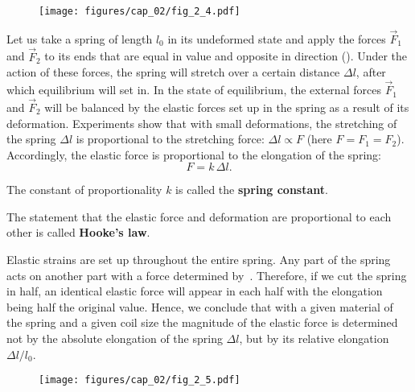 \begin{figure}[t]
	\begin{center}
		\texttt{[image: figures/cap\_02/fig\_2\_4.pdf]}
		\caption[]{}
		\label{fig:2_4}
	\end{center}
	\vspace{-0.8cm}
\end{figure}

Let us take a spring of length $l_0$ in its undeformed state and apply the forces $\vec{F}_1$ and $\vec{F}_2$ to its ends that are equal in value and opposite in direction (). Under the action of these forces, the spring will stretch over a certain distance $\Delta l$, after which equilibrium will set in. In the state of equilibrium, the external forces $\vec{F}_1$ and $\vec{F}_2$ will be balanced by the elastic forces set up in the spring as a result of its deformation. Experiments show that with small deformations, the stretching of the spring $\Delta l$ is proportional to the stretching force: $\Delta l\propto F$ (here $F=F_1=F_2$). Accordingly, the elastic force is proportional to the elongation of the spring:
\begin{equation}\label{eq:2_25}
F = k\,\Delta l.
\end{equation}

\noindent
The constant of proportionality $k$ is called the \textbf{spring constant}.

The statement that the elastic force and deformation are proportional to each other is called \textbf{Hooke's law}.

Elastic strains are set up throughout the entire spring. Any part of the spring acts on another part with a force determined by~. Therefore, if we cut the spring in half, an identical elastic force will appear in each half with the elongation being half the original value. Hence, we conclude that with a given material of the spring and a given coil size the magnitude of the elastic force is determined not by the absolute elongation of the spring $\Delta l$, but by its relative elongation $\Delta l/l_0$.

\begin{figure}[t]
	\begin{center}
		\texttt{[image: figures/cap\_02/fig\_2\_5.pdf]}
		\caption[]{}
		\label{fig:2_5}
	\end{center}
	\vspace{-0.7cm}
\end{figure}

